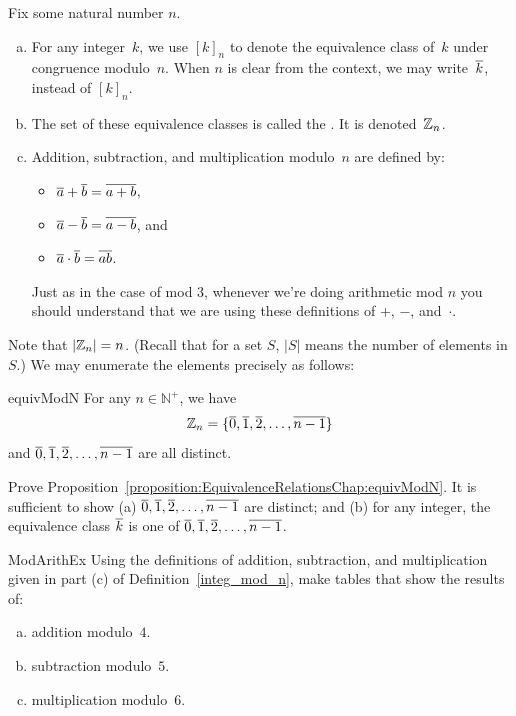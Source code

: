 \begin{defn} \label{integ_mod_n}
Fix some natural number $n$.
\begin{enumerate}[(a)]
\item For any integer~$k$, we use $[k]_n$ to denote the equivalence class of~$k$ under congruence modulo~$n$. When $n$ is clear from the context, we may write~$\overline{k}$, instead of $[k]_n$.
\item The set of these equivalence classes is called the . It is denoted~$\mathbb{Z}_n$.

 \item Addition, subtraction, and multiplication modulo~$n$ are defined by:
\begin{itemize}
\item $\overline{a} \mathbin{+} \overline{b} = \overline{a + b}$,
\item $\overline{a} \mathbin{-} \overline{b} = \overline{a - b}$,
and
\item $\overline{a} \cdot \overline{b} = \overline{a  b}$.
\end{itemize}
Just as in the case of mod 3, whenever we're doing arithmetic mod $n$ you should understand that we are using these definitions of  $+$, $-$, and~$\cdot$.
\end{enumerate}
\end{defn}


Note that $\left|\mathbb{Z}_n \right| = n$. (Recall that for a set $S$, $|S|$ means the number of elements in $S$.) We may enumerate the elements precisely as follows:

\begin{prop}{equivModN}
For any $n \in \mathbb{N}^+$, we have 
	$$\mathbb{Z}_n = \{ \overline{0}, \overline{1}, \overline{2}, \ldots, \overline{n-1} \}$$
and $\overline{0}, \overline{1}, \overline{2}, \ldots, \overline{n-1}$ are all distinct.
\end{prop}

\begin{exercise}{}
Prove Proposition~\ref{proposition:EquivalenceRelationsChap:equivModN}.  It is sufficient to show (a) $\overline{0}, \overline{1}, \overline{2}, \ldots, \overline{n-1} $ are distinct; and (b) for any integer, the  equivalence class $\overline{k}$ is one of $\overline{0}, \overline{1}, \overline{2}, \ldots, \overline{n-1} $.
\end{exercise}

\begin{exercise}{ModArithEx}  
Using the definitions of addition, subtraction, and multiplication given in part (c) of Definition~\ref{integ_mod_n}, make tables that show the results of:
\begin{enumerate}[(a)]
\item \label{ModArithEx-tables-addition} 
addition modulo~$4$.
\item \label{ModArithEx-tables-subtraction} 
subtraction modulo~$5$.
\item \label{ModArithEx-tables-multiplication} 
multiplication modulo~$6$.
\end{enumerate}
\end{exercise}

